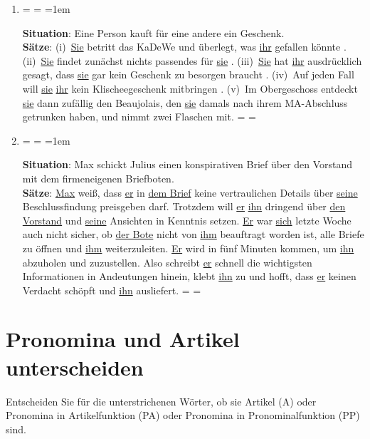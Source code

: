 \documentclass[12pt,a4paper,twoside]{article}
\newenvironment{spread}
{%
  \newdimen\origiwspc%
  \newdimen\origiwstr%
  \origiwspc=\fontdimen2\font%
  \origiwstr=\fontdimen3\font%
  \fontdimen2\font=1em%
  \doublespacing%
}{%
  \fontdimen2\font=\origiwspc%
  \fontdimen3\font=\origiwstr%
}
\begin{document}
\begin{enumerate}
  \item\doublespacing%
    \begin{spread}
      \textbf{Situation}: Eine Person kauft für eine andere ein Geschenk.\\
      \textbf{Sätze}: (i)~\uline{Sie} betritt das KaDeWe und überlegt, was \uline{ihr} gefallen könnte .
      (ii)~\uline{Sie} findet zunächst nichts passendes für \uline{sie} .
      (iii)~\uline{Sie} hat \uline{ihr} ausdrücklich gesagt, dass \uline{sie} gar kein Geschenk zu besorgen braucht .
      (iv)~Auf jeden Fall will \uline{sie} \uline{ihr} kein Klischeegeschenk mitbringen .
      (v)~Im Obergeschoss entdeckt \uline{sie} dann zufällig den Beaujolais, den \uline{sie} damals nach ihrem MA-Abschluss getrunken haben, und nimmt zwei Flaschen mit.\end{spread}
  \item\doublespacing
    \begin{spread}
      \textbf{Situation}: Max schickt Julius einen konspirativen Brief über den Vorstand mit dem firmeneigenen Briefboten.\\
      \textbf{Sätze}: \uline{Max} weiß, dass \uline{er} in \uline{dem Brief} keine vertraulichen Details über \uline{seine} Beschlussfindung preisgeben darf.
      Trotzdem will \uline{er} \uline{ihn} dringend über \uline{den Vorstand} und \uline{seine} Ansichten in Kenntnis setzen.
      \uline{Er} war \uline{sich} letzte Woche auch nicht sicher, ob \uline{der Bote} nicht von \uline{ihm} beauftragt worden ist, alle Briefe zu öffnen und \uline{ihm} weiterzuleiten.
      \uline{Er} wird in fünf Minuten kommen, um \uline{ihn} abzuholen und zuzustellen.
      Also schreibt \uline{er} schnell die wichtigsten Informationen in Andeutungen hinein, klebt \uline{ihn} zu und hofft, dass \uline{er} keinen Verdacht schöpft und \uline{ihn} ausliefert.
  \end{spread}
\end{enumerate}


\section{Pronomina und Artikel unterscheiden}

Entscheiden Sie für die unterstrichenen Wörter, ob sie Artikel (A) oder Pronomina in Artikelfunktion (PA) oder Pronomina in Pronominalfunktion (PP) sind.
\end{document}

